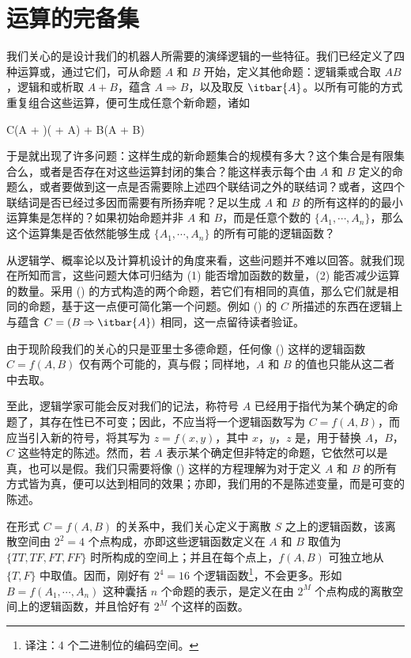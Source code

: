 \section{运算的完备集}

我们关心的是设计我们的机器人所需要的演绎逻辑的一些特征。我们已经定义了四种运算或，通过它们，可从命题 $A$ 和 $B$ 开始，定义其他命题：逻辑乘或合取 $AB$，逻辑和或析取 $A + B$，蕴含 $A\Rightarrow B$，以及取反 $\itbar{A}$。以所有可能的方式重复组合这些运算，便可生成任意个新命题，诸如

\placeformula[1-15]
\startformula
C\equiv (A + )( + A) + B(A + B)
\stopformula

于是就出现了许多问题：这样生成的新命题集合的规模有多大？这个集合是有限集合么，或者是否存在对这些运算封闭的集合？能这样表示每个由 $A$ 和 $B$ 定义的命题么，或者要做到这一点是否需要除上述四个联结词之外的联结词？或者，这四个联结词是否已经过多因而需要有所扬弃呢？足以生成 $A$ 和 $B$ 的所有这样的的最小运算集是怎样的？如果初始命题并非 $A$ 和 $B$，而是任意个数的 $\{A_1,\cdots,A_n\}$，那么这个运算集是否依然能够生成 $\{A_1,\cdots,A_n\}$ 的所有可能的逻辑函数？

从逻辑学、概率论以及计算机设计的角度来看，这些问题并不难以回答。就我们现在所知而言，这些问题大体可归结为 (1) 能否增加函数的数量，(2) 能否减少运算的数量。采用 (\in[1-15]) 的方式构造的两个命题，若它们有相同的真值，那么它们就是相同的命题，基于这一点便可简化第一个问题。例如 (\in[1-15]) 的 $C$ 所描述的东西在逻辑上与蕴含 $C = (B\Rightarrow \itbar{A})$ 相同，这一点留待读者验证。

由于现阶段我们的关心的只是亚里士多德命题，任何像 (\in[1-15]) 这样的逻辑函数 $C = f(A, B)$ 仅有两个可能的，真与假；同样地，$A$ 和 $B$ 的值也只能从这二者中去取。

至此，逻辑学家可能会反对我们的记法，称符号 $A$ 已经用于指代为某个确定的命题了，其存在性已不可变；因此，不应当将一个逻辑函数写为 $C = f(A, B)$，而应当引入新的符号，将其写为 $z = f(x, y)$，其中 $x$，$y$，$z$ 是，用于替换 $A$，$B$，$C$ 这些特定的陈述。然而，若 $A$ 表示某个确定但非特定的命题，它依然可以是真，也可以是假。我们只需要将像 (\in[1-15]) 这样的方程理解为对于定义 $A$ 和 $B$ 的所有方式皆为真，便可以达到相同的效果；亦即，我们用的不是陈述变量，而是可变的陈述。

在形式 $C = f(A, B)$ 的关系中，我们关心定义于离散 $S$ 之上的逻辑函数，该离散空间由 $2^2 = 4$ 个点构成，亦即这些逻辑函数定义在 $A$ 和 $B$ 取值为 $\{TT, TF, FT, FF\}$ 时所构成的空间上；并且在每个点上，$f(A, B)$ 可独立地从 $\{T,F\}$ 中取值。因而，刚好有 $2^4 = 16$ 个逻辑函数\footnote{译注：4 个二进制位的编码空间。}，不会更多。形如 $B = f(A_1, \cdots, A_n)$ 这种囊括 $n$ 个命题的表示，是定义在由 $2^M$ 个点构成的离散空间上的逻辑函数，并且恰好有 $2^M$ 个这样的函数。

